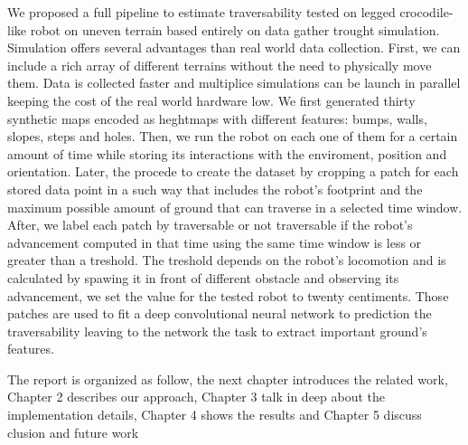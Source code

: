 \documentclass[../document.tex]{subfiles}
\begin{document}
We proposed a full pipeline to estimate traversability tested on legged crocodile-like robot on uneven terrain based entirely on data gather trought simulation. Simulation offers several advantages than real world data collection. First, we can include a rich array of different terrains without the need to physically move them. Data is collected faster and multiplice simulations can be launch in parallel keeping the cost of the real world hardware low. We first generated thirty synthetic maps encoded as heghtmaps with different features: bumps, walls, slopes, steps and holes. Then, we run the robot on each one of them for a certain amount of time while storing its interactions with the enviroment, position and orientation. Later, the procede to create the dataset by cropping a patch for each stored data point in a such way that includes the robot's footprint and the maximum possible amount of ground that can traverse in a selected time window. After, we label each patch by traversable or not traversable if the robot's advancement computed in that time using the same time window is less or greater than a treshold. The treshold depends on the robot's locomotion and is calculated by spawing it in front of different obstacle and observing its advancement, we set the value for the tested robot to twenty centiments. Those patches are used to fit a deep convolutional neural network to prediction the traversability leaving to the network the task to extract important ground's features.

The report is organized as follow, the next chapter  introduces the related work, Chapter 2 describes our approach, Chapter 3 talk in deep about the implementation details,
Chapter 4 shows the results and Chapter 5 discuss clusion and future work
\end{document}
